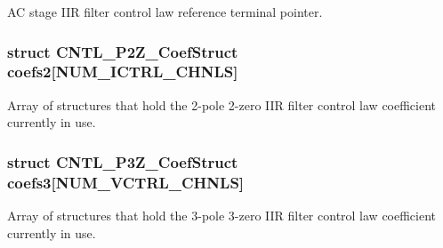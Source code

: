 A\-C stage I\-I\-R filter control law reference terminal pointer. \hypertarget{a00009_a0e862b208ff3b2bb45fcfce1ccd74cd2}{
\subsubsection[{coefs2}]{\setlength{\rightskip}{0pt plus 5cm}struct C\-N\-T\-L\-\_\-P2\-Z\-\_\-\-Coef\-Struct coefs2\mbox{[}{\bf N\-U\-M\-\_\-\-I\-C\-T\-R\-L\-\_\-\-C\-H\-N\-L\-S}\mbox{]}}}\label{a00009_a0e862b208ff3b2bb45fcfce1ccd74cd2}
Array of structures that hold the 2-\/pole 2-\/zero I\-I\-R filter control law coefficient currently in use. \hypertarget{a00009_a84b8a9f9bc8749e7ad42eea593f858c4}{
\subsubsection[{coefs3}]{\setlength{\rightskip}{0pt plus 5cm}struct C\-N\-T\-L\-\_\-P3\-Z\-\_\-\-Coef\-Struct coefs3\mbox{[}{\bf N\-U\-M\-\_\-\-V\-C\-T\-R\-L\-\_\-\-C\-H\-N\-L\-S}\mbox{]}}}\label{a00009_a84b8a9f9bc8749e7ad42eea593f858c4}
Array of structures that hold the 3-\/pole 3-\/zero I\-I\-R filter control law coefficient currently in use. 